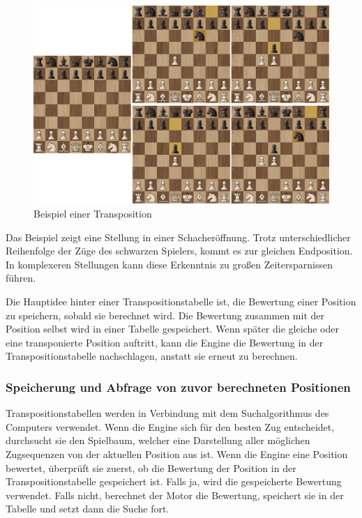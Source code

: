 \begin{figure}[ht]
    \centering
    \includegraphics[scale=0.3]{images/transposition_example.png}
    \caption{Beispiel einer Transposition}
\end{figure}

Das Beispiel zeigt eine Stellung in einer Schacheröffnung. Trotz unterschiedlicher Reihenfolge der Züge des schwarzen Spielers, kommt es zur gleichen Endposition.
In komplexeren Stellungen kann diese Erkenntnis zu großen Zeitersparnissen führen.

Die Hauptidee hinter einer Transpositionstabelle ist, die Bewertung einer Position zu speichern, sobald sie berechnet wird. 
Die Bewertung zusammen mit der Position selbst wird in einer Tabelle gespeichert. 
Wenn später die gleiche oder eine transponierte Position auftritt, kann die Engine die Bewertung in der Transpositionstabelle nachschlagen, 
anstatt sie erneut zu berechnen.~\cite{Jos_W._H_1970_researchgate}

\subsubsection{Speicherung und Abfrage von zuvor berechneten Positionen}
Transpositionstabellen werden in Verbindung mit dem Suchalgorithmus des Computers verwendet. 
Wenn die Engine sich für den besten Zug entscheidet, durchsucht sie den Spielbaum, welcher eine Darstellung aller möglichen 
Zugsequenzen von der aktuellen Position aus ist. 
Wenn die Engine eine Position bewertet, überprüft sie zuerst, ob die Bewertung der Position in der Transpositionstabelle gespeichert ist. 
Falls ja, wird die gespeicherte Bewertung verwendet. Falls nicht, berechnet der Motor die Bewertung, 
speichert sie in der Tabelle und setzt dann die Suche fort.~\cite{Jos_W._H_1970_researchgate}

